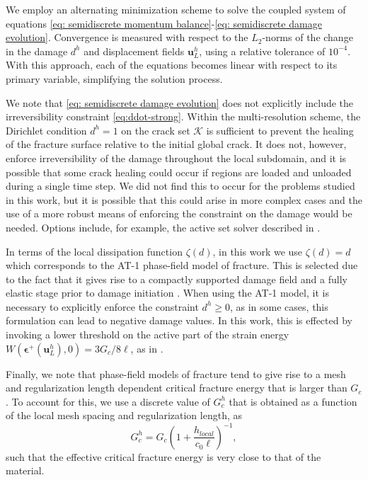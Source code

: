 We employ an alternating minimization scheme to solve the coupled system of equations \eqref{eq: semidiscrete momentum balance}-\eqref{eq: semidiscrete damage evolution}. Convergence is measured with respect to the $L_2$-norms of the change in the damage $d^h$ and  displacement fields $\textbf{u}_L^h$, using a relative tolerance of $10^{-4}$. With this approach, each of the equations becomes linear with respect to its primary variable, simplifying the solution process.

We note that \eqref{eq: semidiscrete damage evolution} does not explicitly include the irreversibility constraint  \eqref{eq:ddot-strong}. Within the multi-resolution scheme, the Dirichlet condition $d^h=1$ on the crack set $\mathcal{K}$ is sufficient to prevent the healing of the fracture surface relative to the initial global crack.  It does not, however, enforce irreversibility of the damage throughout the local subdomain, and it is possible that some crack healing could occur if regions are loaded and unloaded during a single time step.  
We did not find this to occur for the problems studied in this work, but it is possible that this could arise in more complex cases and the use of a more robust means of enforcing the constraint on the damage would be needed.  Options include, for example, the active set solver described in \cite{hu2020frictionless}.   

In terms of the local dissipation function $\zeta(d)$, in this work we use $\zeta(d) = d$ which corresponds to the AT-1 phase-field model of fracture.  This is selected due to the fact that it gives rise to a compactly supported damage field and a fully elastic stage prior to damage initiation \cite{pham2011gradient}.
When using the AT-1 model, it is necessary to explicitly enforce the constraint $d^h \ge 0$, as in some cases, this formulation can lead to negative damage values. In this work, this is effected  by invoking a lower threshold on the active part of the strain energy $W(\boldsymbol{\epsilon^+}(\textbf{u}_L^h),0) = 3G_c/8\ell$, as in \cite{miehe2016phase}. 

Finally, we note that phase-field models of fracture tend to give rise to a mesh and regularization length dependent critical fracture energy that is larger than $G_c$ \cite{bourdin2008variational}.  To account for this, we use a discrete value of $G_c^h$ that is obtained as a function of the local mesh spacing and regularization length, as
    \begin{equation}
        G_c^h = G_c \left( 1 + \dfrac{ h_{local} }{c_0\ell} \right)^{-1},
    \end{equation}
such that the effective critical fracture energy is very close to that of the material.  

